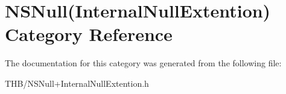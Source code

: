 \hypertarget{category_n_s_null_07_internal_null_extention_08}{}\section{N\+S\+Null(Internal\+Null\+Extention) Category Reference}
\label{category_n_s_null_07_internal_null_extention_08}


The documentation for this category was generated from the following file\+:\begin{DoxyCompactItemize}
\item 
T\+H\+B/N\+S\+Null+\+Internal\+Null\+Extention.\+h\end{DoxyCompactItemize}

